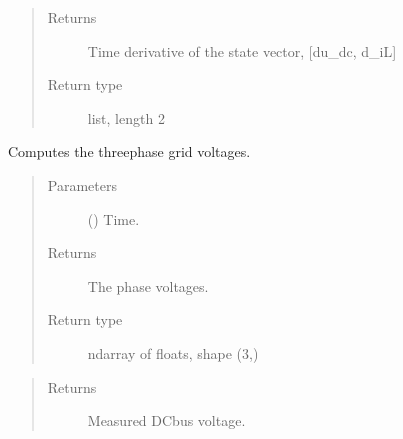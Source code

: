 \documentclass[letterpaper,10pt,english]{sphinxmanual}
\begin{document}
\begin{fulllineitems}
\begin{fulllineitems}
\begin{quote}
\begin{description}
\begin{itemize}
\end{itemize}

\item[{Returns}] \leavevmode
\sphinxAtStartPar
Time derivative of the state vector, {[}du\_dc, d\_iL{]}

\item[{Return type}] \leavevmode
\sphinxAtStartPar
list, length 2

\end{description}\end{quote}

\end{fulllineitems}


\begin{fulllineitems}
\label{\detokenize{model:model.converter.FrequencyConverter.grid_voltages}}
\pysigstartsignatures
{}
\pysigstopsignatures
\sphinxAtStartPar
Computes the three\sphinxhyphen{}phase grid voltages.
\begin{quote}\begin{description}
\item[{Parameters}] \leavevmode
\sphinxAtStartPar
{} () \textendash{} Time.

\item[{Returns}] \leavevmode
\sphinxAtStartPar
{} \textendash{} The phase voltages.

\item[{Return type}] \leavevmode
\sphinxAtStartPar
ndarray of floats, shape (3,)

\end{description}\end{quote}

\end{fulllineitems}


\begin{fulllineitems}
\label{\detokenize{model:model.converter.FrequencyConverter.meas_dc_voltage}}
\pysigstartsignatures
{}
\pysigstopsignatures\begin{quote}\begin{description}
\item[{Returns}] \leavevmode
\sphinxAtStartPar
Measured DC\sphinxhyphen{}bus voltage.


\end{description}
\end{quote}
\end{fulllineitems}
\end{fulllineitems}
\end{document}
